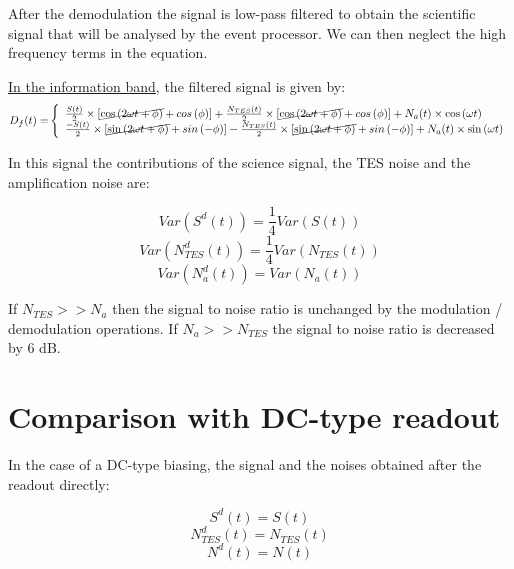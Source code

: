\documentclass[a4paper,11pt]{texMemo} %
\begin{document}
After the demodulation the signal is low-pass filtered to obtain the scientific signal that will be analysed by the event processor. We can then neglect the high frequency terms in the equation.

\underline{In the information band}, the filtered signal is given by:
\begin{align}
D_f(t)=&\left\{ 
	\begin{array}{ll}
		 \frac{S(t)}{2}\times \left[\cancel{\cos\left(2\omega t + \phi\right)}+cos\left(\phi\right)\right]+
		 \frac{N_{TES}(t)}{2}\times \left[\cancel{\cos\left(2\omega t + \phi\right)}+cos\left(\phi\right)\right]+N_a(t)\times \cos\left(\omega t\right)\\
		 \frac{-S(t)}{2}\times \left[\cancel{\sin\left(2\omega t + \phi\right)}+sin\left(-\phi\right)\right]
		 -\frac{N_{TES}(t)}{2}\times \left[\cancel{\sin\left(2\omega t + \phi\right)}+sin\left(-\phi\right)\right]+N_a(t)\times \sin\left(\omega t\right)\\
	\end{array}
	\right. \nonumber \\ 
\end{align} 

In this signal the contributions of the science signal, the TES noise and the amplification noise are:

\begin{multicols}{3}\noindent
\begin{equation}Var(S^d(t))=\frac{1}{4}Var(S(t)) \nonumber \end{equation} 
\begin{equation}Var(N_{TES}^d(t))=\frac{1}{4}Var(N_{TES}(t)) \nonumber \end{equation}
\begin{equation}Var(N_a^d(t))=Var(N_a(t))\end{equation}
\end{multicols}

If $N_{TES}>>N_a$ then the signal to noise ratio is unchanged by the modulation / demodulation operations.
If $N_a>>N_{TES}$ the signal to noise ratio is decreased by 6 dB.


\section{Comparison with DC-type readout}


In the case of a DC-type biasing, the signal and the noises obtained after the readout directly: 

\begin{multicols}{3}\noindent
\begin{equation}S^d(t) = S(t) \nonumber \end{equation} 
\begin{equation}N_{TES}^d(t)=N_{TES}(t) \nonumber \end{equation}
\begin{equation}N^d(t)=N(t)\end{equation}
\end{multicols}



\end{document}
